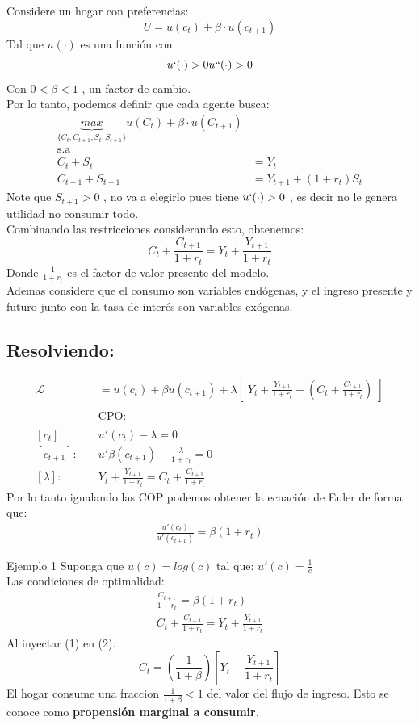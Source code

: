 \documentclass[12pt]{article}
\begin{document}
Considere un hogar con preferencias: 
$$U=u(c_t)+\beta \cdot u(c_{t+1})$$
Tal que $u(\cdot)$ es una función con $$u`(\cdot ) >0\\u``(\cdot ) >0$$ 
Con $0<\beta<1$ , un factor de cambio. \\
Por lo tanto, podemos definir que cada agente busca: 
\begin{align*}
    \underbrace{max}_{\{ C_t, C_{t+1},S_t,S_{t+1}\}} u(C_t)+\beta\cdot u(C_{t+1}) \\ \text{s.a} \\ C_t+S_t & =Y_t \\  C_{t+1}+S_{t+1} & =Y_{t+1}+(1+r_t)S_t 
\end{align*}
Note que $S_{t+1}>0$ , no va a elegirlo pues tiene $u`(\cdot )>0$ , es decir no le genera utilidad no consumir todo. \\
Combinando las restricciones considerando esto, obtenemos: 
$$C_{t}+\frac{C_{t+1}}{1+r_t}=Y_t+\frac{Y_{t+1}}{1+r_t}$$
Donde $\frac{1}{1+r_t}$ es el factor de valor presente del modelo.\\  %
Ademas considere que el consumo son variables endógenas, y el ingreso presente y futuro junto con la tasa de interés son variables exógenas. \\

\subsection{Resolviendo:}
\[ 
\begin{aligned}
    \mathcal{L} &= u(c_t)+ \beta u(c_{t+1}) + \lambda [\;Y_t+\frac{Y_{t+1}}{1+r_t}-(C_{t}+\frac{C_{t+1}}{1+r_t})\; ] \\\\
    &\text{CPO:}\quad\\
    & \\  
    [c_t]:\quad &u'(c_t)-\lambda=0  \\
    [c_{t+1}]: \quad & u'\beta(c_{t+1})- \frac{\lambda }{1+r_t}=0\\
    [\lambda]:\quad &  Y_t+\frac{Y_{t+1}}{1+r_t}=C_{t}+\frac{C_{t+1}}{1+r_t}
\end{aligned}
\]
Por lo tanto igualando las COP podemos obtener la ecuación de Euler de forma que: 
\begin{align*}
    \frac{u'(c_t)}{u'(c_{t+1})}={\beta}({1+r_t})
\end{align*}

\begin{ejemplo}{Ejemplo 1}
    Suponga que $u(c)=log(c)$ tal que: $u'(c)=\frac{1}{c}$\\
    Las condiciones de optimalidad: 
    \begin{align}
        \frac{C_{t+1}}{1+r_t}=\beta(1+r_t)\\
        C_{t}+\frac{C_{t+1}}{1+r_t}=Y_t+\frac{Y_{t+1}}{1+r_t}
    \end{align}
    Al inyectar (1) en (2). \\
    $$ C_t=(\frac{1}{1+\beta})[Y_t+\frac{Y_{t+1}}{1+r_t}] $$
    El hogar consume una fraccion $\frac{1}{1+\beta}<1$ del valor del flujo de ingreso. Esto se conoce como \textbf{propensión marginal a consumir.} 
\end{ejemplo}
\end{document}
